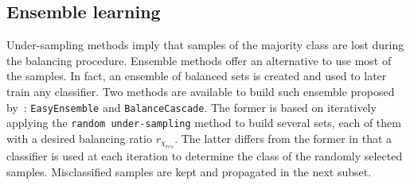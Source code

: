 \documentclass[twoside,11pt]{article}
\begin{document}
\subsection{Ensemble learning}

Under-sampling methods imply that samples of the majority class are lost during the balancing procedure.
Ensemble methods offer an alternative to use most of the samples.
In fact, an ensemble of balanced sets is created and used to later train any classifier.
Two methods are available to build such ensemble proposed by~\cite{liu2009exploratory}: \texttt{EasyEnsemble} and \texttt{BalanceCascade}.
The former is based on iteratively applying the \texttt{random under-sampling} method to build several sets, each of them with a desired balancing ratio $r_{\chi_{res}}$.
The latter differs from the former in that a classifier is used at each iteration to determine the class of the randomly selected samples.
Misclassified samples are kept and propagated in the next subset.
\end{document}
